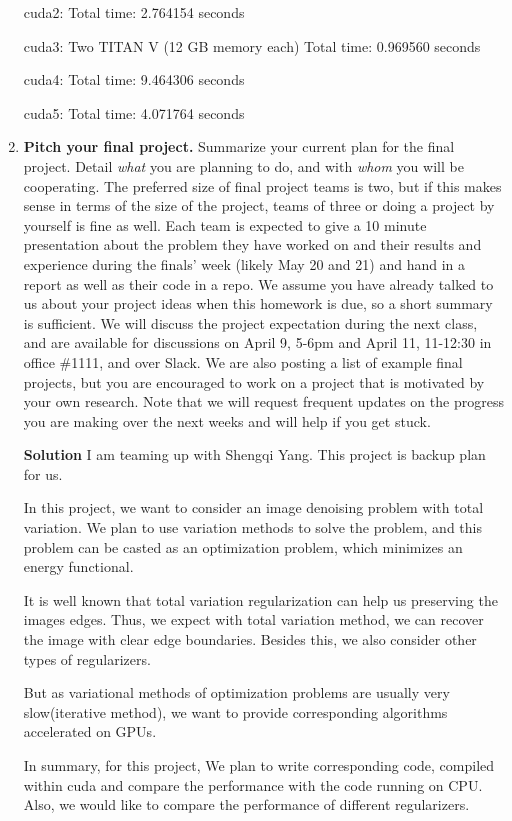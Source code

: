 \documentclass[12pt]{article}
\begin{document}
\begin{enumerate}
cuda2:
Total time:   2.764154 seconds

cuda3: Two TITAN V (12 GB memory each)
Total time:   0.969560 seconds

cuda4: 
Total time:   9.464306 seconds

cuda5: 
Total time:   4.071764 seconds



\item {\bf Pitch your final project.}  Summarize your current plan for
  the final project.  Detail \emph{what} you are planning to do, and
  with \emph{whom} you will be cooperating. The preferred size of
  final project teams is two, but if this makes sense in terms of the
  size of the project, teams of three or doing a project by
  yourself is fine as well.  Each team is expected to give a 10 minute
  presentation about the problem they have worked on and their results
  and experience during the finals' week
  (likely May 20 and 21) and hand in a report as well as their code in
  a repo.  We assume you have
  already talked to us about your project ideas when this homework is due, so a
  short summary is sufficient. We will
  discuss the project expectation during the next class, and are
  available for discussions on April 9, 5-6pm and April 11, 11-12:30
  in office \#1111, and over Slack. We are also posting a list of
  example final projects, but you are encouraged to work on a project that is
  motivated by your own research. Note that we will request
  frequent updates on the progress you are making over the next weeks
  and will help if you get stuck.
  
  
  \textbf{Solution}
  I am teaming up with Shengqi Yang. This project is backup plan for us.
   
  In this project, we want to consider an image denoising problem with total variation. We plan to use variation methods to solve the problem, and this problem can be casted as an optimization problem, which minimizes an energy functional. 
  
  It is well known that total variation regularization can help us preserving the images edges. Thus, we expect with total variation method, we can recover the image with clear edge boundaries. Besides this, we also consider other types of regularizers.
  
  But as variational methods of optimization problems are usually very slow(iterative method), we want to provide corresponding algorithms accelerated on GPUs.
  
  In summary, for this project, We plan to write corresponding code, compiled within cuda and compare the performance with the code running on CPU. Also, we would like to compare the performance of different regularizers.
  
\end{enumerate}
\end{document}
